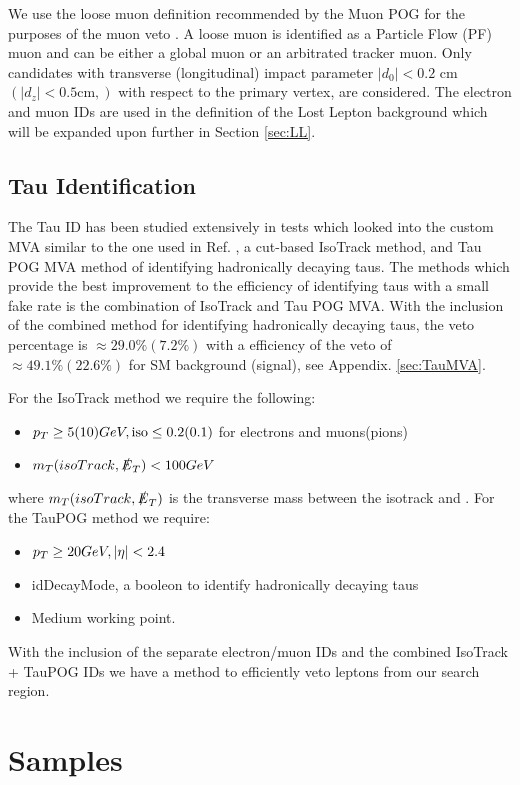  We use the loose muon definition recommended by the Muon POG for the purposes of the muon veto \cite{noauthor_swguidemuonid_nodate}. A loose muon is identified as a Particle Flow (PF)\cite{noauthor_cms_nodate} muon and can be either a global muon or an arbitrated tracker muon. Only candidates with transverse (longitudinal) impact parameter $|d_0|<0.2$ cm $(|d_z|<0.5 \text{cm},)$ with respect to the primary vertex, are considered. The electron and muon IDs are used in the definition of the Lost Lepton background which will be expanded upon further in Section \ref{sec:LL}. 
 
\subsection{Tau Identification}\label{TauID}
The Tau ID has been studied extensively in tests which looked into the custom MVA \cite{roe_boosted_2004, hoecker_tmva_2007} similar to the one used in Ref. \cite{noauthor_search_nodate}, a cut-based IsoTrack method, and Tau POG MVA method of identifying hadronically decaying taus. The methods which provide the best improvement to the efficiency of identifying taus with a small fake rate is the combination of IsoTrack and Tau POG MVA. With the inclusion of the combined method for identifying hadronically decaying taus, the veto percentage is $\approx29.0\%(7.2\%)$ with a efficiency of the veto of $\approx49.1\%(22.6\%)$ for SM background (signal), see Appendix. \ref{sec:TauMVA}. 

For the IsoTrack method we require the following:
\begin{itemize}
	\item $p_{T}\geq5(10) GeV, \text{iso}\leq0.2(0.1)$ for electrons and muons(pions)
	\item $m_T(isoTrack,\slashed{E}_{T})<100 GeV$
\end{itemize}
where $m_T(isoTrack,\slashed{E}_{T})$ is the transverse mass between the isotrack and \met. For the TauPOG method we require:
\begin{itemize}
	\item $p_{T}\geq20 GeV, |\eta|<2.4$
	\item idDecayMode, a booleon to identify hadronically decaying taus
	\item Medium working point.
\end{itemize}
With the inclusion of the separate electron/muon IDs and the combined IsoTrack + TauPOG IDs we have a method to efficiently veto leptons from our search region.

\section{Samples}\label{Samples}



